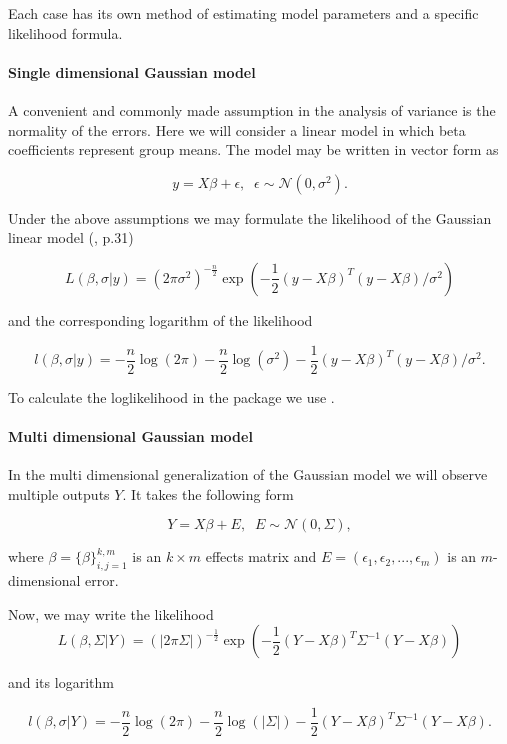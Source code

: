 Each case has its own method of estimating model parameters and a specific likelihood formula.

\paragraph{Single dimensional Gaussian model}

A convenient and commonly made assumption in the analysis of variance is the normality of the errors. Here we will consider a linear model in which beta coefficients represent group means. The model may be written in vector form as

$$y = X \beta + \epsilon, \;\; \epsilon \sim \mathcal{N}\left(0, \sigma^2\right).$$


Under the above assumptions we may formulate the likelihood of the Gaussian linear model (\citealp{friedman2001elements}, p.31)

$$L\left(\beta, \sigma | y\right) = \left(2\pi \sigma^2\right)^{-\frac{n}{2}} 
\exp{\left(-\frac{1}{2}\left(y - X\beta\right)^T\left(y - X\beta\right)/ \sigma^2\right)}$$

and the corresponding logarithm of the likelihood

$$l\left(\beta, \sigma | y\right) = 
-\frac{n}{2} \log{\left(2\pi\right)} -\frac{n}{2} \log{\left(\sigma^2\right)} -\frac{1}{2}\left(y - X\beta\right)^T\left(y - X\beta\right)/ \sigma^2.$$


To calculate the loglikelihood in the package we use .


\paragraph{Multi dimensional Gaussian model} In the multi dimensional generalization of the Gaussian model we will observe multiple outputs $Y$. It takes the following form

$$Y = X \beta + E, \;\; E \sim \mathcal{N}(0, \Sigma),$$

where $\beta = \{\beta\}_{i,j=1}^{k,m}$ is an $k \times m$ effects matrix and $E = \left(\epsilon_1, \epsilon_2, ..., \epsilon_m\right)$ is an $m$-dimensional error.

Now, we may write the likelihood 
$$L\left(\beta, \Sigma | Y\right) = \left(|2\pi \Sigma|\right)^{-\frac{1}{2}} 
\exp{\left(-\frac{1}{2}\left(Y - X\beta\right)^T\Sigma^{-1}\left(Y - X\beta\right)\right)}$$

and its logarithm

$$l\left(\beta, \sigma | Y\right) = 
-\frac{n}{2} \log{\left(2\pi\right)} -\frac{n}{2} \log{\left(|\Sigma|\right)} -\frac{1}{2}\left(Y - X\beta\right)^T\Sigma^{-1}\left(Y - X\beta\right).$$

